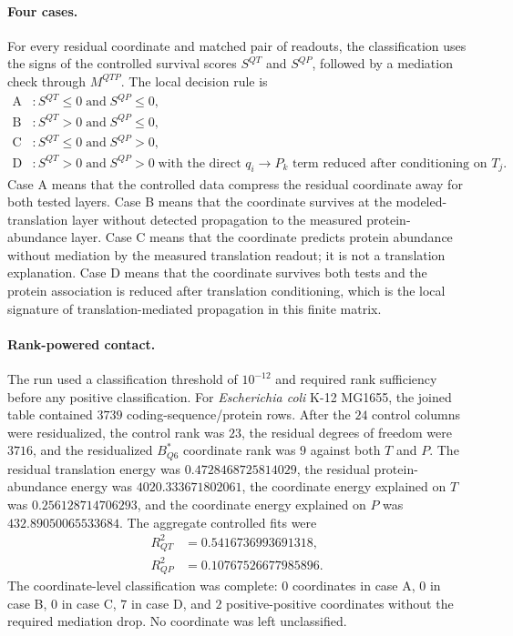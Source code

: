 \paragraph{Four cases.}
For every residual coordinate and matched pair of readouts, the classification uses the signs of the controlled survival scores $S^{QT}$ and $S^{QP}$, followed by a mediation check through $M^{QTP}$. The local decision rule is
$$
\begin{aligned}
\mathrm{A} &: S^{QT}\leq 0 \;\text{and}\; S^{QP}\leq 0,\\
\mathrm{B} &: S^{QT}>0 \;\text{and}\; S^{QP}\leq 0,\\
\mathrm{C} &: S^{QT}\leq 0 \;\text{and}\; S^{QP}>0,\\
\mathrm{D} &: S^{QT}>0 \;\text{and}\; S^{QP}>0 \;\text{with the direct } q_i\to P_k \text{ term reduced after conditioning on } T_j.
\end{aligned}
$$
Case A means that the controlled data compress the residual coordinate away for both tested layers. Case B means that the coordinate survives at the modeled-translation layer without detected propagation to the measured protein-abundance layer. Case C means that the coordinate predicts protein abundance without mediation by the measured translation readout; it is not a translation explanation. Case D means that the coordinate survives both tests and the protein association is reduced after translation conditioning, which is the local signature of translation-mediated propagation in this finite matrix.

\paragraph{Rank-powered contact.}
The run used a classification threshold of $10^{-12}$ and required rank sufficiency before any positive classification. For \textit{Escherichia coli} K-12 MG1655, the joined table contained $3739$ coding-sequence/protein rows. After the $24$ control columns were residualized, the control rank was $23$, the residual degrees of freedom were $3716$, and the residualized $B^*_{Q6}$ coordinate rank was $9$ against both $T$ and $P$. The residual translation energy was $0.4728468725814029$, the residual protein-abundance energy was $4020.333671802061$, the coordinate energy explained on $T$ was $0.256128714706293$, and the coordinate energy explained on $P$ was $432.89050065533684$. The aggregate controlled fits were
$$
\begin{aligned}
R^2_{QT} &= 0.5416736993691318,\\
R^2_{QP} &= 0.10767526677985896.
\end{aligned}
$$
The coordinate-level classification was complete: $0$ coordinates in case A, $0$ in case B, $0$ in case C, $7$ in case D, and $2$ positive-positive coordinates without the required mediation drop. No coordinate was left unclassified.

